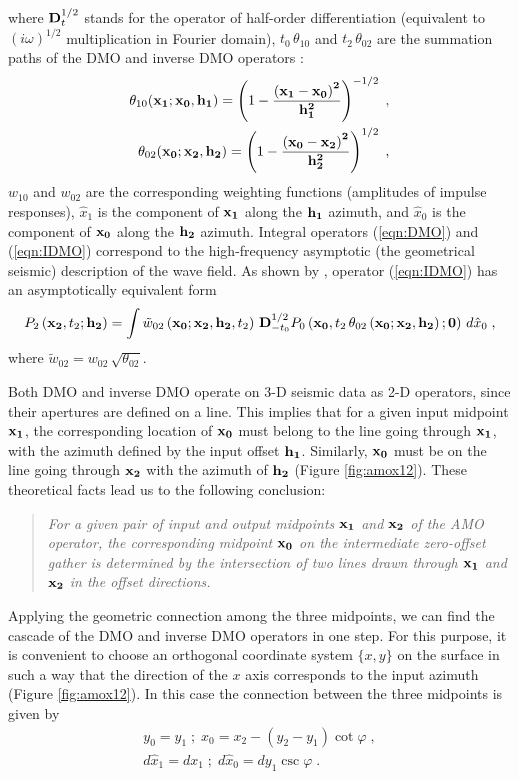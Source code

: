 where ${\bf D}_t^{1/2}$ stands for the operator of half-order differentiation
(equivalent to $(i \omega)^{1/2}$ multiplication in Fourier domain),
$t_0\, \theta_{10}$ and $t_2\,\theta_{02}$ are the summation paths of
the DMO and inverse DMO  
operators \cite[]{GPR29-03-03740406}:
\begin{eqnarray}
\theta_{10}({\bf x_1;x_0, h_1})=
\left(1-{\bf \left(x_1-x_0\right)^2 \over h_1^2}\right)^{-1/2}\;,
\label{eqn:DMOtt}\\
\theta_{02}({\bf x_0;x_2, h_2})=
\left(1-{\bf \left(x_0-x_2\right)^2 \over h_2^2}\right)^{1/2}\;,
\label{eqn:IDMOtt}
\end{eqnarray}
$w_{10}$ and $w_{02}$ are the corresponding weighting functions (amplitudes of
impulse responses), $\hat{x}_1$ is the component of ${\bf x_1}$ along the
${\bf h_1}$ azimuth, and $\hat{x}_0$ is the component of ${\bf x_0}$
along the
${\bf h_2}$ azimuth. 
Integral operators (\ref{eqn:DMO}) and (\ref{eqn:IDMO}) correspond to
the high-frequency asymptotic (the geometrical seismic) description of
the wave field. As shown by \cite{myDMO}, 
operator (\ref{eqn:IDMO}) has an asymptotically equivalent
form
\begin{equation}
P_2\left({\bf x_2},t_2;{\bf h_2}\right)=\int 
\tilde{w}_{02}\left({\bf x_0;x_2, h_2},t_2\right)\,
{\bf D}_{-t_0}^{1/2}P_0\left({\bf x_0},t_2\,\theta_{02}
\left({\bf x_0;x_2, h_2}\right);
{\bf 0}\right)\,d\hat{x}_0\;,
\label{eqn:tIDMO}
\end{equation}
where $\tilde{w}_{02}=w_{02}\,\sqrt{\theta_{02}}$.
\par
Both DMO and inverse DMO operate on 3-D seismic data
as 2-D operators, since their apertures are defined on a line. This
implies that for a given input midpoint ${\bf x_1}$, the corresponding
location of ${\bf x_0}$ must belong to the
line going through ${\bf x_1}$, with the azimuth defined by the input
offset ${\bf h_1}$. 
Similarly, ${\bf x_0}$ must be on the line going through 
${\bf x_2}$ with the azimuth of ${\bf h_2}$ (Figure \ref{fig:amox12}).
These theoretical facts lead us to the following conclusion: 
\begin{quote}
{\em For a given pair of input and output midpoints ${\bf x_1}$ and ${\bf x_2}$
of the AMO operator, the corresponding midpoint ${\bf x_0}$ on
the intermediate zero-offset gather is determined by the  intersection of 
two lines drawn
through ${\bf x_1}$ and ${\bf x_2}$
in the offset directions.} 
\end{quote}
Applying the geometric connection among the three midpoints, we can
find the cascade 
of the DMO
and inverse DMO operators in one step.
For this purpose, it is convenient to choose an orthogonal coordinate
system $\{x,y\}$ on the 
surface in such a way that the direction of the $x$ axis corresponds
to the input azimuth 
(Figure \ref{fig:amox12}).
In this case the connection between the three midpoints is given by
\begin{eqnarray}
y_0=y_1\;;\;x_0=x_2-\left(y_2-y_1\right) \cot{\varphi}\;,
\label{eqn:x012}\\
d\hat{x}_1=dx_1\;;\;d\hat{x}_0=dy_1 \csc{\varphi}\;.
\label{eqn:jacob}
\end{eqnarray}

